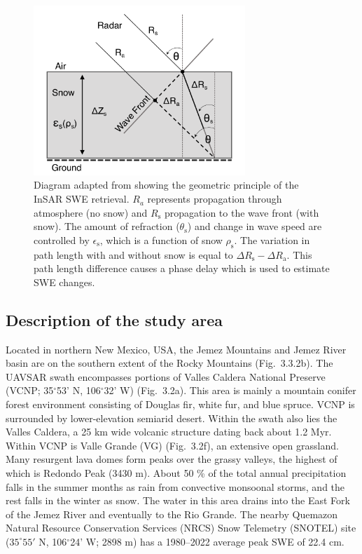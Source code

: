\begin{figure}[t]
\centering\includegraphics[width=8cm]{figures/ch3_figs/fig01.pdf}
\caption{Diagram adapted from \citet{leinssSnowWaterEquivalent2015} showing the geometric principle of the InSAR SWE retrieval. $R_a$ represents propagation through atmosphere (no snow) and $R_\mathrm{s}$ propagation to the wave front (with snow). The amount of refraction ($\theta_\mathrm{s}$) and change in wave speed are controlled by $\epsilon_\mathrm{s}$, which is a function of snow $\rho_\mathrm{s}$. The variation in path length with and without snow is equal to $\Delta R_\mathrm{s} - \Delta R_\mathrm{a}$. This path length difference causes a phase delay which is used to estimate SWE changes.}
\end{figure}

\hypertarget{ch3-methods-3}{\subsection{Description of the study area}\label{ch3-methods-3}}


Located in northern New Mexico, USA, the Jemez Mountains and Jemez River basin are on the southern extent of the Rocky Mountains (Fig.~3.3.2b). The UAVSAR swath encompasses portions of Valles Caldera National Preserve (VCNP; 35$^{\circ}$53' N, 106$^{\circ}$32' W) (Fig.~3.2a). This area is mainly a mountain conifer forest environment consisting of Douglas fir, white fur, and blue spruce. VCNP is surrounded by lower-elevation semiarid desert. Within the swath also lies the Valles Caldera, a 25 km wide volcanic structure dating back about 1.2 Myr. Within VCNP is Valle Grande (VG) (Fig.~3.2f), an extensive open grassland. Many resurgent lava domes form peaks over the grassy valleys, the highest of which is Redondo Peak (3430 m). About 50 \% of the total annual precipitation falls in the summer months as rain from convective monsoonal storms, and the rest falls in the winter as snow. The water in this area drains into the East Fork of the Jemez River and eventually to the Rio Grande. The nearby Quemazon Natural Resource Conservation Services (NRCS) Snow Telemetry (SNOTEL) site ($35^{\circ}55'$ N, 106$^{\circ}$24' W; 2898 m) has a 1980--2022 average peak SWE of 22.4 cm.

